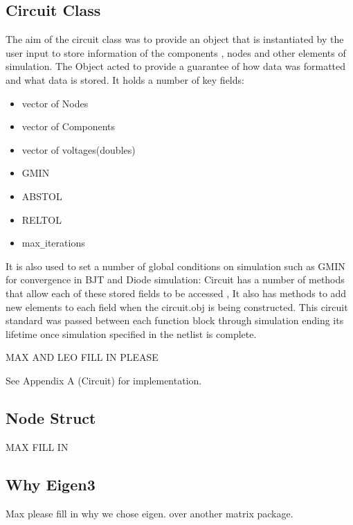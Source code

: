 \documentclass{article}
\begin{document}
\subsection{Circuit Class}
The aim of the circuit class was to provide an object that is instantiated by the user input to store information of the components , nodes and other elements of simulation. The Object acted to provide a guarantee of how data was formatted and what data is stored. It holds a number of key fields:
\medbreak
\noindent\begin{minipage}{.5\linewidth}
\begin{itemize}
    \item vector of Nodes
    \item vector of Components
    \item vector of voltages(doubles)
\end{itemize}
\end{minipage}%
\begin{minipage}{.5\linewidth}
\begin{itemize}\break
    \item GMIN
    \item ABSTOL
    \item RELTOL
    \item max\verb|_|iterations
\end{itemize}
\end{minipage}
\medbreak
It is also used to set a number of global conditions on simulation such as GMIN for convergence in BJT and Diode simulation:
\medbreak
Circuit has a number of methods that allow each of these stored fields to be accessed , It also has methods to add new elements to each field when the circuit.obj is being constructed. This circuit standard was passed between each function block through simulation ending its lifetime once simulation specified in the netlist is complete.

MAX AND LEO FILL IN PLEASE

\bigbreak
See Appendix A (Circuit) for implementation.
\subsection{Node Struct}
MAX FILL IN
\newpage
\subsection{Why Eigen3}
Max please fill in why we chose eigen. over another matrix package.
\end{document}
